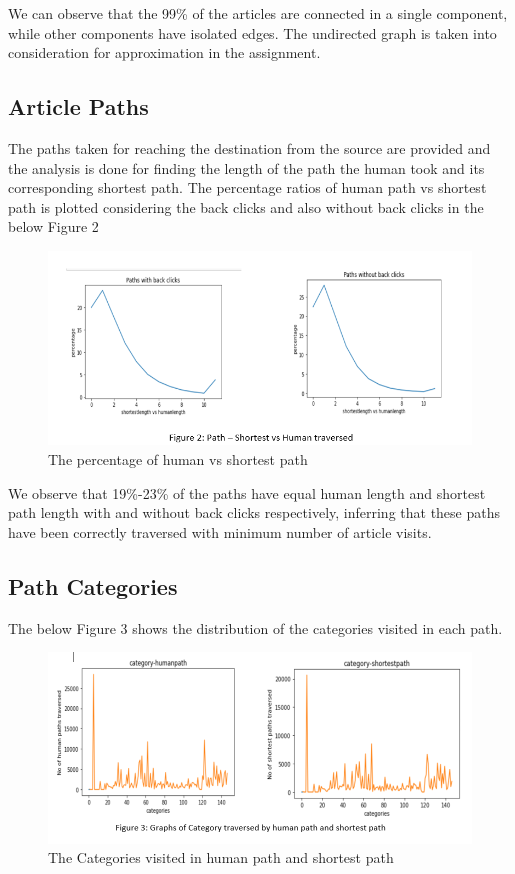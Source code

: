 \documentclass{article}
\begin{document}
\hspace{2cm}
We can observe that the 99\% of the articles are connected in a single component, while other components have isolated edges. 
The undirected graph is taken into consideration for approximation in the assignment.
\subsection{Article Paths}
\vspace{0.5cm} 
\hspace{2cm}
The paths taken for reaching the destination from the source are provided and the analysis is done for finding the length of the path the human took and its corresponding shortest path. 
The percentage ratios of human path vs shortest path is plotted considering the back clicks and also without back clicks in the below Figure 2

\begin{figure}[htp]
    \centering
    \includegraphics[width=12cm]{hp-sp.png}
    \caption{The percentage of human vs shortest path}
    \label{fig:graphs}
\end{figure}
\FloatBarrier
We observe that 19\%-23\% of the paths have equal human length and shortest path length with and without back clicks respectively, inferring that these paths have been correctly traversed with minimum number of article visits.

\subsection{Path Categories}
\vspace{0.5cm} 
\hspace{2cm}
The below Figure 3 shows the distribution of the categories visited in each path.
\begin{figure}[htp]
    \centering
    \includegraphics[width=12cm]{cat-path.png}
    \caption{The Categories visited in human path and shortest path}
    \label{fig:graphs}
\end{figure}
\FloatBarrier
 
\end{document}

